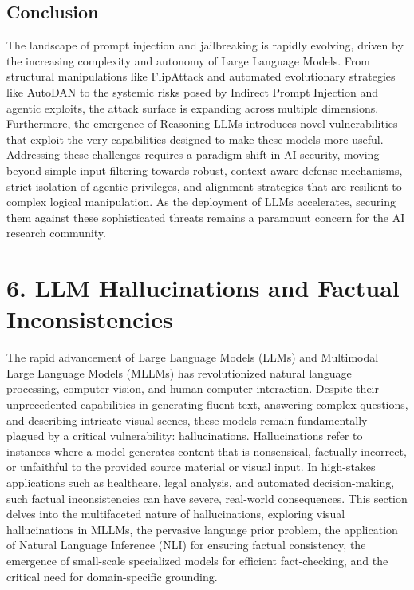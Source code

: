 \documentclass[11pt,a4paper]{article}
\begin{document}
\subsection{Conclusion}
The landscape of prompt injection and jailbreaking is rapidly evolving, driven by the increasing complexity and autonomy of Large Language Models. From structural manipulations like FlipAttack and automated evolutionary strategies like AutoDAN to the systemic risks posed by Indirect Prompt Injection and agentic exploits, the attack surface is expanding across multiple dimensions. Furthermore, the emergence of Reasoning LLMs introduces novel vulnerabilities that exploit the very capabilities designed to make these models more useful. Addressing these challenges requires a paradigm shift in AI security, moving beyond simple input filtering towards robust, context-aware defense mechanisms, strict isolation of agentic privileges, and alignment strategies that are resilient to complex logical manipulation. As the deployment of LLMs accelerates, securing them against these sophisticated threats remains a paramount concern for the AI research community.

\section{6. LLM Hallucinations and Factual Inconsistencies}

The rapid advancement of Large Language Models (LLMs) and Multimodal Large Language Models (MLLMs) has revolutionized natural language processing, computer vision, and human-computer interaction. Despite their unprecedented capabilities in generating fluent text, answering complex questions, and describing intricate visual scenes, these models remain fundamentally plagued by a critical vulnerability: hallucinations. Hallucinations refer to instances where a model generates content that is nonsensical, factually incorrect, or unfaithful to the provided source material or visual input. In high-stakes applications such as healthcare, legal analysis, and automated decision-making, such factual inconsistencies can have severe, real-world consequences. This section delves into the multifaceted nature of hallucinations, exploring visual hallucinations in MLLMs, the pervasive language prior problem, the application of Natural Language Inference (NLI) for ensuring factual consistency, the emergence of small-scale specialized models for efficient fact-checking, and the critical need for domain-specific grounding.
\end{document}
